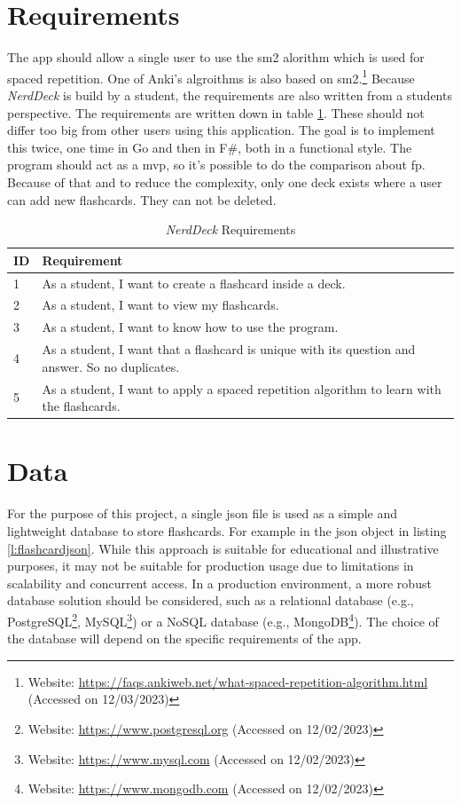     \section{Requirements}
     The \ac{app} should allow a single user to use the \ac{sm2} alorithm which is used for spaced repetition.\cite{sm2} One of Anki's algroithms is also based on \ac{sm2}.\footnote{Website: \url{https://faqs.ankiweb.net/what-spaced-repetition-algorithm.html} (Accessed on 12/03/2023)} Because \textit{NerdDeck} is build by a student, the requirements are also written from a students perspective. The requirements are written down in table \ref{tab:requirements}. These should not differ too big from other users using this application. The goal is to implement this twice, one time in Go and then in F\#, both in a functional style. The program should act as a \ac{mvp}, so it's possible to do the comparison about \ac{fp}. Because of that and to reduce the complexity, only one deck exists where a user can add new flashcards. They can not be deleted.
    \begin{table}[h]
        \centering
        \begin{tabular}{|m{0.5in}|m{4in}|}
            \hline
            \textbf{ID} & \textbf{Requirement} \\
            \hline
            1 & As a student, I want to create a flashcard inside a deck. \\
            \hline
            2 & As a student, I want to view my flashcards. \\
            \hline
            3 & As a student, I want to know how to use the program. \\
            \hline
            4 & As a student, I want that a flashcard is unique with its question and answer. So no duplicates.  \\
            \hline
            5 & As a student, I want to apply a spaced repetition algorithm to learn with the flashcards. \\
            \hline
        \end{tabular}
        \caption{\textit{NerdDeck} Requirements}\label{tab:requirements}
    \end{table}

    \section{Data}
    For the purpose of this project, a single \ac{json} file is used as a simple and lightweight database to store flashcards. For example in the \ac{json} object in listing \ref{l:flashcardjson}. While this approach is suitable for educational and illustrative purposes, it may not be suitable for production usage due to limitations in scalability and concurrent access. In a production environment, a more robust database solution should be considered, such as a relational database (e.g., PostgreSQL\footnote{Website: \url{https://www.postgresql.org} (Accessed on 12/02/2023)}, MySQL\footnote{Website: \url{https://www.mysql.com} (Accessed on 12/02/2023)}) or a NoSQL database (e.g., MongoDB\footnote{Website: \url{https://www.mongodb.com} (Accessed on 12/02/2023)}). The choice of the database will depend on the specific requirements of the \ac{app}.

